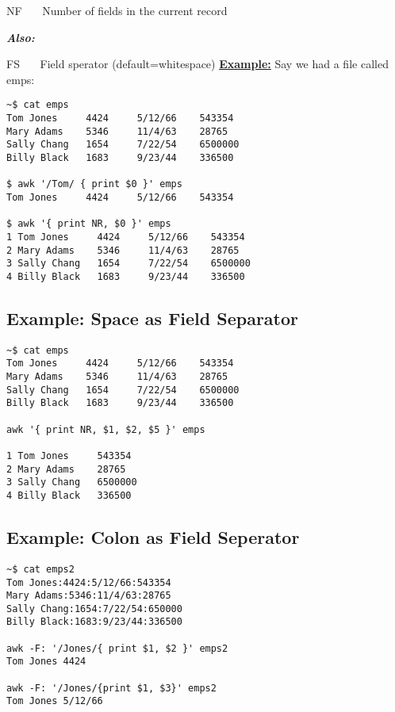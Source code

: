 \documentclass{report}
\begin{document}
  \noindent  NF \ \ \ Number of fields in the current record \vspace{1.5mm}
  
 \noindent \textit{\textbf{Also:}} \vspace{2mm}

  \noindent FS \ \ \ Field sperator (default=whitespace)
\bigbreak \noindent
\textbf{\underline{Example:}}
\bigbreak \noindent
Say we had a file called emps:
\begin{verbatim}
~$ cat emps
Tom Jones     4424     5/12/66    543354
Mary Adams    5346     11/4/63    28765
Sally Chang   1654     7/22/54    6500000
Billy Black   1683     9/23/44    336500

$ awk '/Tom/ { print $0 }' emps
Tom Jones     4424     5/12/66    543354

$ awk '{ print NR, $0 }' emps
1 Tom Jones     4424     5/12/66    543354
2 Mary Adams    5346     11/4/63    28765
3 Sally Chang   1654     7/22/54    6500000
4 Billy Black   1683     9/23/44    336500
\end{verbatim}
\subsection*{Example: Space as Field Separator}
\begin{mdframed}
  \begin{verbatim}
~$ cat emps
Tom Jones     4424     5/12/66    543354
Mary Adams    5346     11/4/63    28765
Sally Chang   1654     7/22/54    6500000
Billy Black   1683     9/23/44    336500

awk '{ print NR, $1, $2, $5 }' emps

1 Tom Jones     543354
2 Mary Adams    28765
3 Sally Chang   6500000
4 Billy Black   336500
\end{verbatim}
\end{mdframed}
\newpage
\subsection*{Example: Colon as Field Seperator}
\begin{verbatim}
~$ cat emps2
Tom Jones:4424:5/12/66:543354
Mary Adams:5346:11/4/63:28765
Sally Chang:1654:7/22/54:650000
Billy Black:1683:9/23/44:336500

awk -F: '/Jones/{ print $1, $2 }' emps2
Tom Jones 4424

awk -F: '/Jones/{print $1, $3}' emps2
Tom Jones 5/12/66
\end{verbatim}
\end{document}
